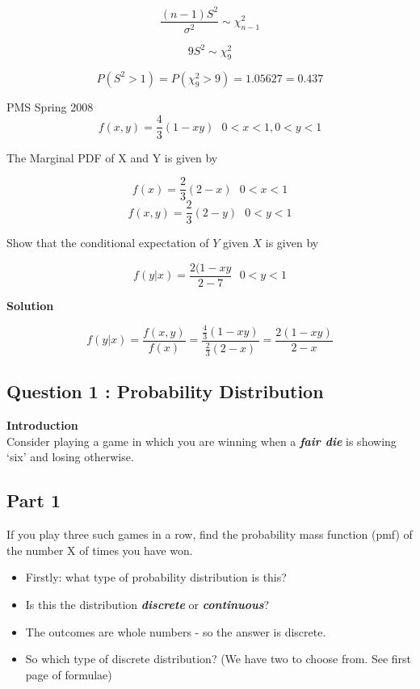 \documentclass[]{report}
\begin{document}
{\[ \frac{(n-1)S^2}{\sigma^2} \sim \chi^2_{n-1}\]

\[ 9S^2 \sim \chi^2_{9}\]


\[ P(S^2>1) = P(\chi^2_{9}>9) = 1.05627 = 0.437\]


PMS Spring 2008 
\[f(x,y) = \frac{4}{3}(1-xy) \mbox{   }0<x<1,0<y<1  \]

The Marginal PDF of X and Y is given by 

\[f(x) = \frac{2}{3}(2-x) \mbox{   }0<x<1 \]
\[f(x,y) = \frac{2}{3}(2-y) \mbox{   }0<y<1  \]

Show that the conditional expectation of $Y$ given $X$ is given by

\[ f(y|x) = \frac{2(1-xy}{2-7} \mbox{   }0<y<1\]

\textbf{Solution}

\[ f(y|x) = \frac{f(x,y)}{f(x)} = \frac{\frac{4}{3}(1-xy)}{\frac{2}{3}(2-x)} = \frac{2(1-xy)}{2-x}\]





\subsection{Question 1 : Probability Distribution}

\noindent \textbf{Introduction}\\

Consider playing a game in which you are winning when a \textbf{\emph{fair die}} is showing `six'
and losing otherwise.

\subsection{Part 1}If you play three such games in a row, find the probability mass function (pmf) of the number
X of times you have won.

{
\begin{itemize}
\item Firstly: what type of probability distribution is this?

\item Is this the distribution \textbf{\emph{discrete}} or  \textbf{\emph{continuous}}?

\item The outcomes are whole numbers - so the answer is discrete.

\item So which type of discrete distribution? (We have two to choose from. See first page of formulae)



\end{itemize}}}
\end{document}
